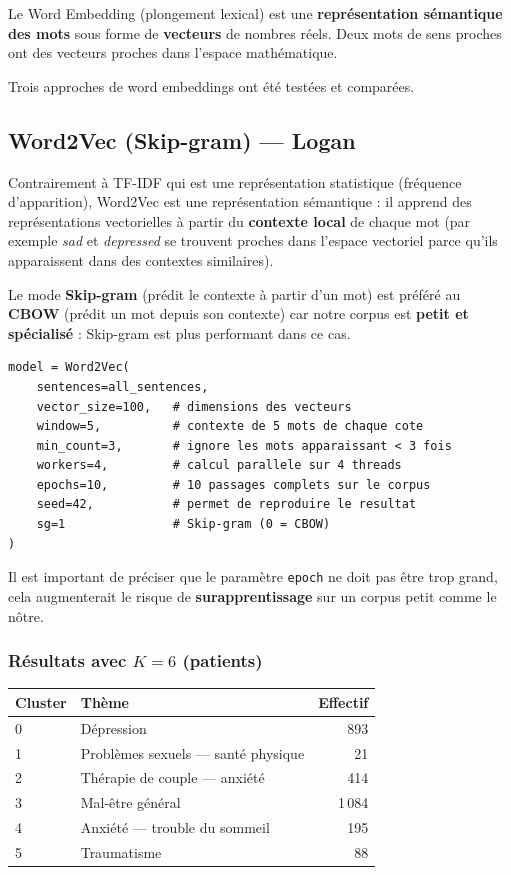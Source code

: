 \documentclass[12pt,a4paper]{article}
\begin{document}
Le Word Embedding (plongement lexical) est une \textbf{représentation sémantique des mots} sous forme de \textbf{vecteurs} de nombres réels. Deux mots de sens proches ont des vecteurs proches dans l'espace mathématique.

Trois approches de word embeddings ont été testées et comparées.

\subsection{Word2Vec (Skip-gram) --- Logan}

Contrairement à TF-IDF qui est une représentation statistique (fréquence d'apparition), Word2Vec est une représentation sémantique : il apprend des représentations vectorielles à partir du \textbf{contexte local} de chaque mot (par exemple \textit{sad} et \textit{depressed} se trouvent proches dans l'espace vectoriel parce qu'ils apparaissent dans des contextes similaires).

Le mode \textbf{Skip-gram} (prédit le contexte à partir d'un mot) est préféré au \textbf{CBOW} (prédit un mot depuis son contexte) car notre corpus est \textbf{petit et spécialisé} : Skip-gram est plus performant dans ce cas.

\begin{lstlisting}
model = Word2Vec(
    sentences=all_sentences,
    vector_size=100,   # dimensions des vecteurs
    window=5,          # contexte de 5 mots de chaque cote
    min_count=3,       # ignore les mots apparaissant < 3 fois
    workers=4,         # calcul parallele sur 4 threads
    epochs=10,         # 10 passages complets sur le corpus
    seed=42,           # permet de reproduire le resultat
    sg=1               # Skip-gram (0 = CBOW)
)
\end{lstlisting}

Il est important de préciser que le paramètre \texttt{epoch} ne doit pas être trop grand, cela augmenterait le risque de \textbf{surapprentissage} sur un corpus petit comme le nôtre.

\subsubsection*{Résultats avec $K = 6$ (patients)}

\begin{center}
\begin{tabular}{llr}
\toprule
\textbf{Cluster} & \textbf{Thème} & \textbf{Effectif} \\
\midrule
0 & Dépression & 893 \\
1 & Problèmes sexuels --- santé physique & 21 \\
2 & Thérapie de couple --- anxiété & 414 \\
3 & Mal-être général & 1\,084 \\
4 & Anxiété --- trouble du sommeil & 195 \\
5 & Traumatisme & 88 \\
\bottomrule
\end{tabular}
\end{center}
\end{document}
